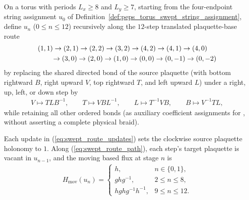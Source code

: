 \begin{definition}%
    \label{def:peps_torus_swept_route_bond_assignments}
    \leanok
    On a torus with periods $L_x\ge 8$ and $L_y\ge 7$, starting from the four-endpoint string assignment $u_0$ of Definition~\ref{def:peps_torus_swept_string_assignment}, define $u_n$ ($0\le n\le 12$) recursively along the $12$-step translated plaquette-base route
    \begin{align}
         & (1,1)\to(2,1)\to(2,2)\to(3,2)\to(4,2)\to(4,1)\to(4,0) \notag                         \\
         & \qquad\to(3,0)\to(2,0)\to(1,0)\to(0,0)\to(0,-1)\to(0,-2) \label{eq:swept_route_path}
    \end{align}
    by replacing the shared directed bond of the source plaquette (with bottom rightward $B$, right upward $V$, top rightward $T$, and left upward $L$) under a right, up, left, or down step by
    \begin{align}
        V\mapsto TL B^{-1},\qquad T\mapsto VB L^{-1},\qquad L\mapsto T^{-1}VB,\qquad B\mapsto V^{-1}TL, \label{eq:swept_route_updates}
    \end{align}
    while retaining all other ordered bonds (as auxiliary coefficient assignments for \cite[\S6.6, local lines 2340--2423]{Schuch2010PEPS}, without asserting a complete physical braid).
\end{definition}

\begin{lemma}%
    \label{thm:peps_torus_swept_route_vacancies}
    \leanok
    Each update in (\ref{eq:swept_route_updates}) sets the clockwise source plaquette holonomy to $1$.
    Along (\ref{eq:swept_route_path}), each step's target plaquette is vacant in $u_{n-1}$, and the moving based flux at stage $n$ is
    \begin{align}
        H_{\mathrm{mov}}(u_n) =
        \begin{cases}
            h,               & n\in\{0,1\},  \\
            ghg^{-1},        & 2\le n\le 8,  \\
            hghg^{-1}h^{-1}, & 9\le n\le 12.
        \end{cases}
        \label{eq:swept_route_moving_flux}
    \end{align}
\end{lemma}

